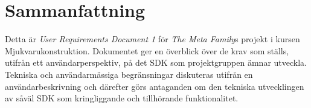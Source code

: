 \section*{Sammanfattning} %
Detta är \textit{User Requirements Document 1}  för \textit{The Meta Family}s projekt i kursen Mjukvarukonstruktion. Dokumentet ger en överblick över de krav som ställs, utifrån ett användarperspektiv, på det SDK som projektgruppen ämnar utveckla. Tekniska och användarmässiga begränsningar diskuteras utifrån en användarbeskrivning och därefter görs antaganden om den tekniska utvecklingen av såväl SDK som kringliggande och tillhörande funktionalitet.